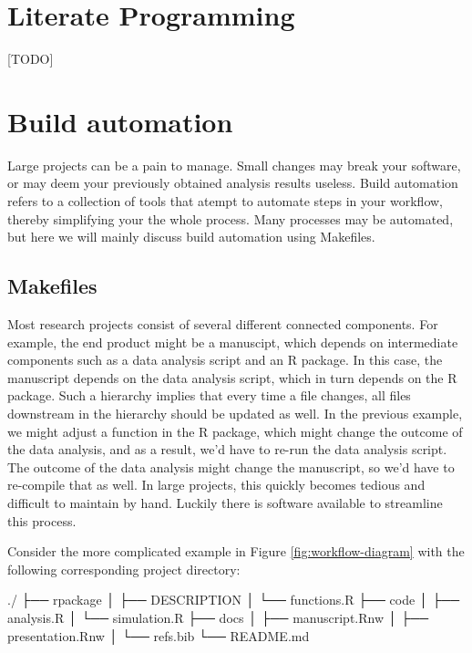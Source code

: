 \documentclass[]{book}
\newenvironment{Shaded}{\begin{snugshade}}{\end{snugshade}}
\newcommand{\ExtensionTok}[1]{#1}
\newcommand{\NormalTok}[1]{#1}
\begin{document}
\chapter{Literate Programming}\label{chptr-literate-programming}

{[}TODO{]}

\chapter{Build automation}\label{chptr-workflow-automation}

Large projects can be a pain to manage. Small changes may break your
software, or may deem your previously obtained analysis results useless.
Build automation refers to a collection of tools that atempt to automate
steps in your workflow, thereby simplifying your the whole process. Many
processes may be automated, but here we will mainly discuss build
automation using Makefiles.

\section{Makefiles}\label{makefiles}

Most research projects consist of several different connected
components. For example, the end product might be a manuscipt, which
depends on intermediate components such as a data analysis script and an
R package. In this case, the manuscript depends on the data analysis
script, which in turn depends on the R package. Such a hierarchy implies
that every time a file changes, all files downstream in the hierarchy
should be updated as well. In the previous example, we might adjust a
function in the R package, which might change the outcome of the data
analysis, and as a result, we'd have to re-run the data analysis script.
The outcome of the data analysis might change the manuscript, so we'd
have to re-compile that as well. In large projects, this quickly becomes
tedious and difficult to maintain by hand. Luckily there is software
available to streamline this process.

Consider the more complicated example in Figure
\ref{fig:workflow-diagram} with the following corresponding project
directory:

\begin{Shaded}
\begin{Highlighting}[]
\ExtensionTok{./}
\NormalTok{├── }\ExtensionTok{rpackage}
\NormalTok{│   ├── }\ExtensionTok{DESCRIPTION}
\NormalTok{│   └── }\ExtensionTok{functions.R}
\NormalTok{├── }\ExtensionTok{code}
\NormalTok{│   ├── }\ExtensionTok{analysis.R}
\NormalTok{│   └── }\ExtensionTok{simulation.R}
\NormalTok{├── }\ExtensionTok{docs}
\NormalTok{│   ├── }\ExtensionTok{manuscript.Rnw}
\NormalTok{│   ├── }\ExtensionTok{presentation.Rnw}
\NormalTok{│   └── }\ExtensionTok{refs.bib}
\NormalTok{└── }\ExtensionTok{README.md}
\end{Highlighting}
\end{Shaded}
\end{document}
